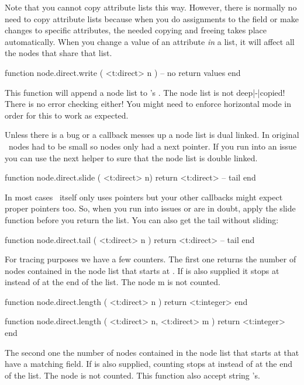 Note that you cannot copy attribute lists this way. However, there is normally no
need to copy attribute lists because when you do assignments to the 
field or make changes to specific attributes, the needed copying and freeing
takes place automatically. When you change a value of an attribute {\em in} a
list, it will affect all the nodes that share that list.

\starttyping[option=LUA]
function node.direct.write ( <t:direct> n )
    -- no return values
end
\stoptyping

This function will append a node list to \TEX's . The node
list is not deep|-|copied! There is no error checking either! You might need to
enforce horizontal mode in order for this to work as expected.

\stopsubsection

\startsubsection[title={Manipulating lists}]

Unless there is a bug or a callback messes up a node list is dual linked. In original
\TEX\ nodes had to be small so nodes only had a next pointer. If you run into an issue
you can use the next helper to sure that the node list is double linked.

\starttyping[option=LUA]
function node.direct.slide ( <t:direct> n)
    return <t:direct> -- tail
end
\stoptyping

In most cases \TEX\ itself only uses  pointers but your other
callbacks might expect proper  pointers too. So, when you run into
issues or are in doubt, apply the slide function before you return the list. You
can also get the tail without sliding:

\starttyping[option=LUA]
function node.direct.tail ( <t:direct> n )
    return <t:direct> -- tail
end
\stoptyping

For tracing purposes we have a few counters. The first one returns the number of
nodes contained in the node list that starts at . If  is also
supplied it stops at  instead of at the end of the list. The node \type
{m} is not counted.

\starttyping[option=LUA]
function node.direct.length (
    <t:direct> n
)
    return <t:integer>
end

function node.direct.length (
    <t:direct> n,
    <t:direct> m
)
    return <t:integer>
end
\stoptyping

The second one the number of nodes contained in the node list that starts at
 that have a matching  field. If  is also supplied,
counting stops at  instead of at the end of the list. The node 
is not counted. This function also accept string 's.

